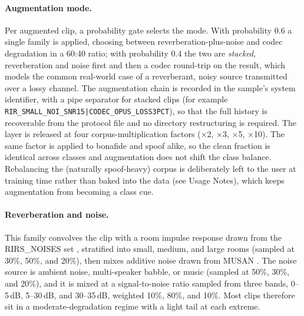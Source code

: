 \documentclass[11pt]{article}
\begin{document}
\paragraph{Augmentation mode.} Per augmented clip, a probability gate
selects the mode. With probability 0.6 a single family is applied,
choosing between reverberation-plus-noise and codec degradation in a
60:40 ratio; with probability 0.4 the two are \emph{stacked},
reverberation and noise first and then a codec round-trip on the result,
which models the common real-world case of a reverberant, noisy source
transmitted over a lossy channel. The augmentation chain is recorded in
the sample's system identifier, with a pipe separator for stacked clips
(for example \texttt{RIR\_SMALL\_NOI\_SNR15|CODEC\_OPUS\_LOSS3PCT}), so
that the full history is recoverable from the protocol file and no
directory restructuring is required. The layer is released at four
corpus-multiplication factors ($\times$2, $\times$3, $\times$5,
$\times$10). The same factor is applied to bonafide and spoof alike, so
the clean fraction is identical across classes and augmentation does not
shift the class balance. Rebalancing the (naturally spoof-heavy) corpus
is deliberately left to the user at training time rather than baked into
the data (see Usage Notes), which keeps augmentation from becoming a
class cue.

\paragraph{Reverberation and noise.} This family convolves the clip with
a room impulse response drawn from the RIRS\_NOISES set \citep{ko2017rir},
stratified into small, medium, and large rooms (sampled at 30\%, 50\%,
and 20\%), then mixes additive noise drawn from MUSAN \citep{musan}. The
noise source is ambient noise, multi-speaker babble, or music (sampled
at 50\%, 30\%, and 20\%), and it is mixed at a signal-to-noise ratio
sampled from three bands, 0--5\,dB, 5--30\,dB, and 30--35\,dB, weighted
10\%, 80\%, and 10\%. Most clips therefore sit in a moderate-degradation
regime with a light tail at each extreme.
\end{document}
